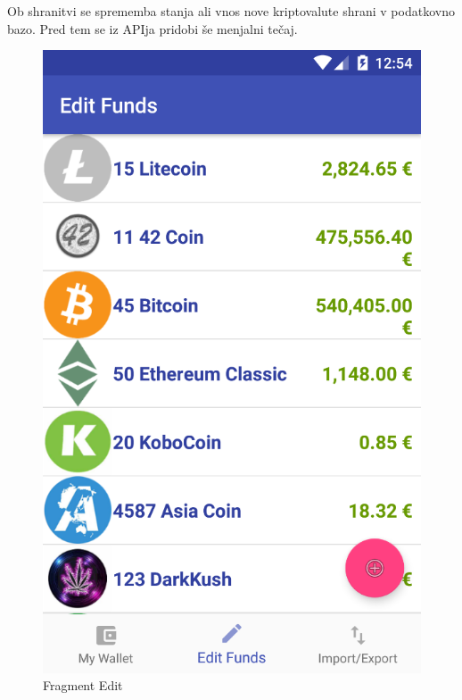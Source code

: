 \documentclass[11pt,a4paper]{article}
\begin{document}
Ob shranitvi se sprememba stanja ali vnos nove kriptovalute shrani v podatkovno
bazo. Pred tem se iz APIja pridobi še menjalni tečaj. 

\begin{figure}[htb]
	\begin{center}
		\includegraphics[width=0.8\columnwidth]{edit_funds.png}
	\end{center}
	\caption{Fragment Edit}
	\label{fig:edit_fragment}
\end{figure}
\end{document}
